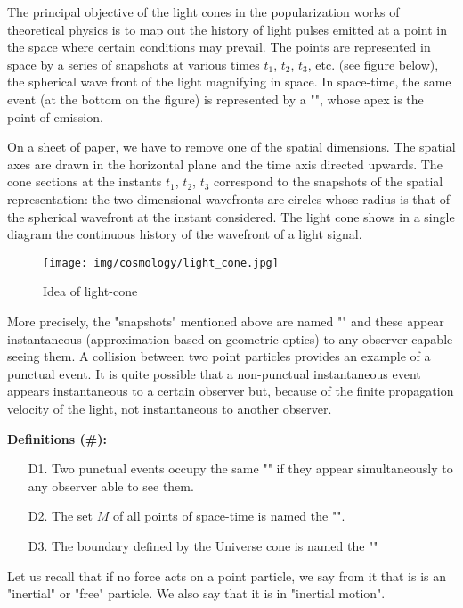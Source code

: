 	The principal objective of the light cones in the popularization works of theoretical physics is to map out the history of light pulses emitted at a point in the space where certain conditions may prevail. The points are represented in space by a series of snapshots at various times $t_1$, $t_2$, $t_3$, etc. (see figure below), the spherical wave front of the light magnifying in space. In space-time, the same event (at the bottom on the figure) is represented by a "", whose apex is the point of emission.

	On a sheet of paper, we have to remove one of the spatial dimensions. The spatial axes are drawn in the horizontal plane and the time axis directed upwards. The cone sections at the instants $t_1$, $t_2$, $t_3$ correspond to the snapshots of the spatial representation: the two-dimensional wavefronts are circles whose radius is that of the spherical wavefront at the instant considered. The light cone shows in a single diagram the continuous history of the wavefront of a light signal.
	\begin{figure}[H]
		\centering
		\texttt{[image: img/cosmology/light\_cone.jpg]}
		\caption{Idea of light-cone}	
	\end{figure}
	More precisely, the "snapshots" mentioned above are named "" and these appear instantaneous (approximation based on geometric optics) to any observer capable seeing them. A collision between two point particles provides an example of a punctual event. It is quite possible that a non-punctual instantaneous event appears instantaneous to a certain observer but, because of the finite propagation velocity of the light, not instantaneous to another observer.

	\textbf{Definitions (\#\mydef):}
	\begin{itemize}
		\item[D1.] Two punctual events occupy the same "" if they appear simultaneously to any observer able to see them.

		\item[D2.] The set $M$ of all points of space-time is named the "".

		\item[D3.] The boundary defined by the Universe cone is named the ""
	\end{itemize}
	Let us recall that if no force acts on a point particle, we say from it that is is an "inertial" or "free" particle. We also say that it is in "inertial motion".

